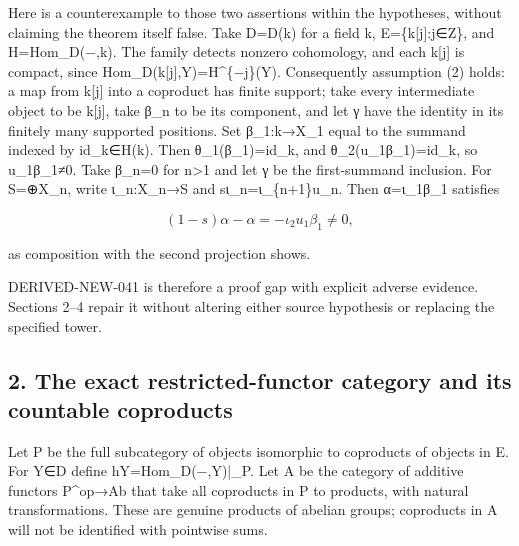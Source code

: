 Here is a counterexample to those two assertions within the hypotheses,\allowbreak{} without claiming the theorem itself false. Take D\allowbreak{}=D(k)\allowbreak{} for a field k,\allowbreak{} E\allowbreak{}=\{k[j]\allowbreak{}:\allowbreak{}j\allowbreak{}∈Z\},\allowbreak{} and H\allowbreak{}=Hom\_\allowbreak{}D(−,\allowbreak{}k)\allowbreak{}. The family detects nonzero cohomology,\allowbreak{} and each k[j]\allowbreak{} is compact,\allowbreak{} since Hom\_\allowbreak{}D(k[j]\allowbreak{},\allowbreak{}Y)\allowbreak{}\allowbreak{}=H\textasciicircum{}\{−j\}(Y)\allowbreak{}. Consequently assumption (2)\allowbreak{} holds:\allowbreak{} a map from k[j]\allowbreak{} into a coproduct has finite support; take every intermediate object to be k[j]\allowbreak{},\allowbreak{} take β\_\allowbreak{}n to be its component,\allowbreak{} and let γ have the identity in its finitely many supported positions. Set β\_\allowbreak{}1:\allowbreak{}k\allowbreak{}→X\_\allowbreak{}1 equal to the summand indexed by id\_\allowbreak{}k\allowbreak{}∈H(k)\allowbreak{}. Then θ\_\allowbreak{}1(β\_\allowbreak{}1)\allowbreak{}\allowbreak{}=id\_\allowbreak{}k,\allowbreak{} and θ\_\allowbreak{}2(u\_\allowbreak{}1β\_\allowbreak{}1)\allowbreak{}\allowbreak{}=id\_\allowbreak{}k,\allowbreak{} so u\_\allowbreak{}1β\_\allowbreak{}1≠0. Take β\_\allowbreak{}n\allowbreak{}=0 for n\textgreater1 and let γ be the first-summand inclusion. For S\allowbreak{}=\allowbreak{}⊕X\_\allowbreak{}n,\allowbreak{} write ι\_\allowbreak{}n:\allowbreak{}X\_\allowbreak{}n\allowbreak{}→S and sι\_\allowbreak{}n\allowbreak{}=ι\_\allowbreak{}\{n\allowbreak{}+1\}u\_\allowbreak{}n. Then α\allowbreak{}=ι\_\allowbreak{}1β\_\allowbreak{}1 satisfies

\[
 (1-s)\alpha-\alpha=-\iota_2u_1\beta_1\ne0,
\]

as composition with the second projection shows.

DERIVED-NEW-041 is therefore a proof gap with explicit adverse evidence. Sections 2–\allowbreak{}4 repair it without altering either source hypothesis or replacing the specified tower.

\subsection{2. The exact restricted-functor category and its countable coproducts}\label{proofs-11460-11655-the-exact-restricted-functor-category-and-its-countable-coproducts}

Let P be the full subcategory of objects isomorphic to coproducts of objects in E. For Y\allowbreak{}∈D define hY\allowbreak{}=Hom\_\allowbreak{}D(−,\allowbreak{}Y)\allowbreak{}|\_\allowbreak{}P. Let A be the category of additive functors P\textasciicircum{}op\allowbreak{}→Ab that take all coproducts in P to products,\allowbreak{} with natural transformations. These are genuine products of abelian groups; coproducts in A will not be identified with pointwise sums.

